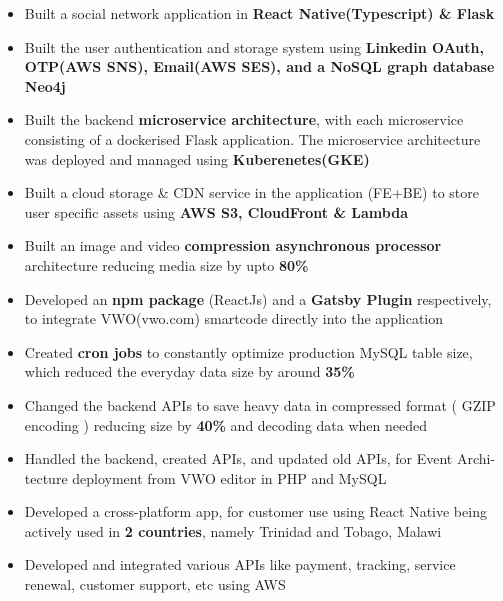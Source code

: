 \documentclass[10pt,a4paper,ragged2e,withhyper]{altacv}
\begin{document}
\begin{paracol}{2}
\begin{itemize}
\item Built a social network application in {\bf React Native(Typescript) \& Flask}
\item Built the user authentication and storage system using {\bf Linkedin OAuth, OTP(AWS SNS), Email(AWS SES), and a NoSQL graph database Neo4j}
\item Built the backend {\bf microservice architecture}, with each microservice consisting of a dockerised Flask application. The microservice architecture was deployed and managed using {\bf Kuberenetes(GKE)}
\item Built a cloud storage \& CDN service in the application (FE+BE) to store user specific assets using {\bf AWS S3, CloudFront \& Lambda}
\item Built an image and video {\bf compression asynchronous processor} architecture reducing media size by upto {\bf 80\% }
\end{itemize}

\divider\smallskip

\begin{itemize}
\item Developed an {\bf npm package} (ReactJs) and a {\bf Gatsby Plugin} respectively, to integrate VWO(vwo.com) smartcode directly into the application
\item Created {\bf cron jobs} to constantly optimize production MySQL table size, which reduced the everyday data size by around {\bf 35\%}
\item Changed the backend APIs to save heavy data in compressed format ( GZIP encoding ) reducing size by {\bf40\%} and decoding data when needed
\item Handled the backend, created APIs, and updated old APIs, for Event Archi-
tecture deployment from VWO editor in PHP and MySQL
\end{itemize}

\divider\smallskip


\begin{itemize}
\item Developed a cross-platform app, for customer use using React Native being actively used in {\bf 2 countries}, namely Trinidad and Tobago, Malawi
\item Developed and integrated various APIs like payment, tracking, service renewal, customer support, etc using AWS
\end{itemize}


\end{paracol}
\end{document}
